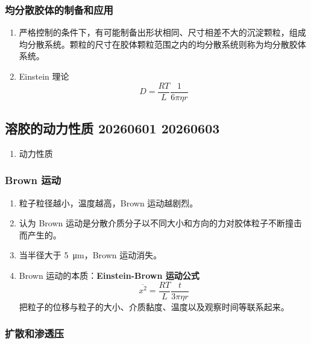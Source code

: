 \subsubsection{均分散胶体的制备和应用}

\begin{enumerate}
    \item 严格控制的条件下，有可能制备出形状相同、尺寸相差不大的沉淀颗粒，组成均分散系统。颗粒的尺寸在胶体颗粒范围之内的均分散系统则称为均分散胶体系统。
    \item Einstein 理论
    \begin{equation*}
        D = \frac{R T}{L}\frac1{6\pi \eta r}
    \end{equation*}
\end{enumerate}

\subsection{溶胶的动力性质 20260601 20260603}

\begin{enumerate}
    \item 动力性质
\end{enumerate}

\subsubsection{Brown 运动}

\begin{enumerate}
    \item 粒子粒径越小，温度越高，Brown 运动越剧烈。
    \item 认为 Brown 运动是分散介质分子以不同大小和方向的力对胶体粒子不断撞击而产生的。
    \item 当半径大于 \qty{5}{\micro\meter}，Brown 运动消失。
    \item Brown 运动的本质：\textbf{Einstein-Brown 运动公式}
    \begin{equation}
        \overline{x^2} = \frac{R T}{L} \frac{t}{3\pi \eta r}
    \end{equation}
    把粒子的位移与粒子的大小、介质黏度、温度以及观察时间等联系起来。
\end{enumerate}

\subsubsection{扩散和渗透压}

